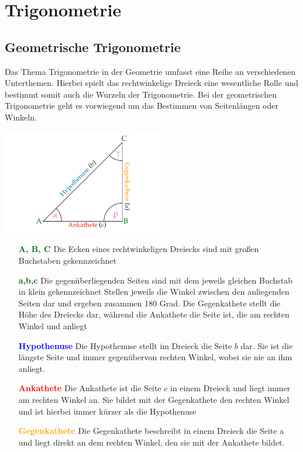 \section{Trigonometrie}
	\subsection{Geometrische Trigonometrie}
	Das Thema Trigonometrie in der Geometrie umfasst eine Reihe an verschiedenen Unterthemen. Hierbei
spielt das rechtwinkelige Dreieck eine wesentliche Rolle und bestimmt somit auch die Wurzeln der
Trigonometrie. Bei der geometrischen Trigonometrie geht es vorwiegend um das Bestimmen von
Seitenlängen oder Winkeln.
\begin{center}
	\includegraphics[width=200pt, height=130pt]{Media/Dreieck}
\end{center}
\begin{itemize}
	\item[\textcolor{darkgreen}{\textbf{A, B, C}}]{}
	Die Ecken eines rechtwinkeligen Dreiecks sind mit großen Buchstaben gekennzeichnet
	
	\item[\textcolor{darkgreen}{\textbf{a,b,c}}]{Die gegenüberliegenden Seiten sind mit dem jeweils
	gleichen Buchstab in klein gekennzeichnet
	Stellen jeweils die Winkel zwischen den anliegenden Seiten dar und ergeben zusammen 180 Grad.
	Die Gegenkathete stellt die Höhe
	des Dreiecks dar, während die Ankathete die Seite ist, die am rechten Winkel  und  anliegt}
	
	
	\item[\textcolor{blue}{\textbf{Hypothenuse}}]{}
	Die Hypothenuse stellt im Dreieck die Seite $b$ dar. Sie ist die längste Seite und immer
	gegenübervon rechten Winkel, wobei sie nie an ihm anliegt. 


	\item[\textcolor{red}{\textbf{Ankathete}}]{}
	Die Ankathete ist die Seite $c$ in einem Dreieck und liegt immer am rechten Winkel an. Sie bildet mit der Gegenkathete den rechten Winkel und ist hierbei immer kürzer als die Hypothenuse
	
	
	\item[\textcolor{orange}{\textbf{Gegenkathete}}]{}
	Die Gegenkathete beschreibt in einem Dreieck die Seite a und liegt direkt an dem rechten Winkel,
	den sie mit der Ankathete bildet. 
\end{itemize}
\pagebreak

